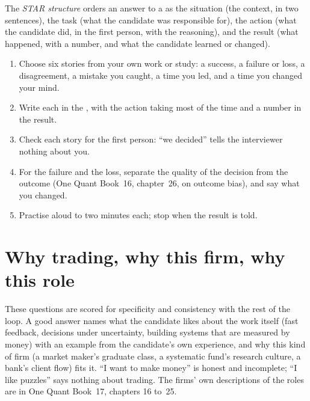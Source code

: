 \begin{definition}\label{def:iv:behavioural-and-fit:star}
The \emph{STAR structure} orders an answer to a  as the situation (the context, in two
sentences), the task (what the candidate was responsible for), the action (what the candidate did, in the first person, with the
reasoning), and the result (what happened, with a number, and what the candidate learned or changed).
\end{definition}

\begin{method}\label{met:iv:behavioural-and-fit:prepare}
\begin{enumerate}
\item Choose six stories from your own work or study: a success, a failure or loss, a disagreement, a mistake you caught, a time you
led, and a time you changed your mind.
\item Write each in the , with the action taking most of the time and a number in the result.
\item Check each story for the first person: ``we decided'' tells the interviewer nothing about you.
\item For the failure and the loss, separate the quality of the decision from the outcome (One Quant Book~16, chapter~26, on
outcome bias), and say what you changed.
\item Practise aloud to two minutes each; stop when the result is told.
\end{enumerate}
\end{method}

\section{Why trading, why this firm, why this role}

These questions are scored for specificity and consistency with the rest of the loop. A good answer names what the candidate
likes about the work itself (fast feedback, decisions under uncertainty, building systems that are measured by money) with an
example from the candidate's own experience, and why this kind of firm (a market maker's graduate class, a systematic fund's
research culture, a bank's client flow) fits it. ``I want to make money'' is honest and incomplete; ``I like puzzles'' says
nothing about trading. The firms' own descriptions of the roles are in One Quant Book~17, chapters 16 to~25.

